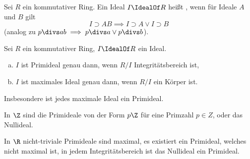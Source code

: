 \begin{df*}
	Sei $R$ ein kommutativer Ring.
	Ein Ideal $I \IdealOf R$ heißt , wenn für Ideale $A$ und $B$ gilt
	\[
		I \supset A B \implies I \supset A \lor I \supset B
	\]
	(analog zu $p \divs ab \implies p\divs a \lor p \divs b$).
\end{df*}

\begin{lem} \label{8.13}
	Sei $R$ ein kommutativer Ring, $I \IdealOf R$ ein Ideal.
	\begin{enumerate}[a)]
		\item
			$I$ ist Primideal genau dann, wenn $R / I$ Integritätsbereich ist,
		\item
			$I$ ist maximales Ideal genau dann, wenn $R / I$ ein Körper ist.
	\end{enumerate}
	Insbesondere ist jedes maximale Ideal ein Primideal.
	\begin{note}
		In $\Z$ sind die Primideale von der Form $p\Z$ für eine Primzahl $p \in Z$, oder das Nullideal.

		In $\R$ nicht-triviale Primideale sind maximal, es existiert ein Primideal, welches nicht maximal ist, in jedem Integritätsbereich ist das Nullideal ein Primideal.
	\end{note}
\end{lem}
